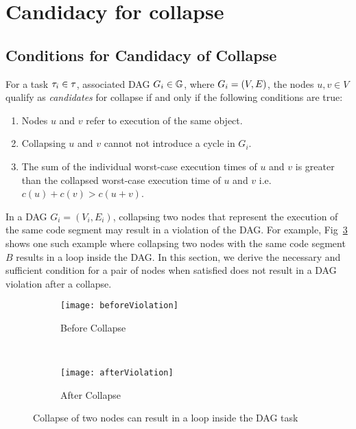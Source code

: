 \section{Candidacy for collapse}

\subsection{Conditions for Candidacy of Collapse}
For a task ${\tau_{i} \in \tau{}}$, associated DAG ${\Dag{i}
  \in \dagset{}}$, where ${\Dag{i} = (V, E)}$,
the nodes ${u,v \in V}$ qualify as \emph{candidates} for collapse if
and only if the following conditions are true:
\begin{enumerate}
  \item Nodes ${u}$ and ${v}$ refer to execution of the same object.
  \item Collapsing ${u}$ and ${v}$ cannot not introduce a cycle in ${G_i}$.
  \item The sum of the individual worst-case execution times of ${u}$
    and ${v}$ is greater than the collapsed worst-case execution time
    of ${u}$ and ${v}$ i.e. ${c(u) + c(v) > c(u + v)}$.
\end{enumerate}

In a DAG ${G_i = (V_i, E_i)}$, collapsing two nodes that represent the
execution of the same code segment may result in a violation of the
DAG. For example, Fig~\ref{fig:dag-violation} shows one such example
where collapsing two nodes with the same code segment $B$ results in a
loop inside the DAG. In this section, we derive the necessary and
sufficient condition for a pair of nodes when satisfied does not
result in a DAG violation after a collapse.


\begin{figure}
  \centering
  \begin{subfigure}[b]{0.48\textwidth}{
      \texttt{[image: beforeViolation]}
      \caption{Before Collapse}
      \label{fig:beforeViolation}
    }
  \end{subfigure}~
  \begin{subfigure}[b]{0.33\textwidth}{
      \texttt{[image: afterViolation]}
      \caption{After Collapse}
      \label{fig:afterViolation}
    }
  \end{subfigure}
  \caption{Collapse of two nodes can result in a loop inside the DAG task}
  \label{fig:dag-violation}
\end{figure}

